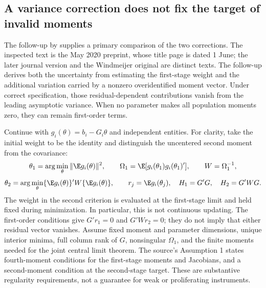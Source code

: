 \subsection{A variance correction does not fix the target of invalid moments}
\label{rel32:gmm-variance-target}
The follow-up by \citet[Sections 2--4]{rel32hkl} supplies a primary
comparison of the two corrections. The inspected text is the May 2020
preprint, whose title page is dated 1 June; the later journal version
and the Windmeijer original are distinct texts. The follow-up derives
both the uncertainty from estimating the first-stage weight and the
additional variation carried by a nonzero overidentified moment vector.
Under correct specification, those residual-dependent contributions
vanish from the leading asymptotic variance. When no parameter makes
all population moments zero, they can remain first-order terms.

Continue with $g_i(\theta)=b_i-G_i\theta$ and independent entities.
For clarity, take the initial weight to be the identity and distinguish
the uncentered second moment from the covariance:
\[
 \theta_1=\arg\min_\theta\|\E g_i(\theta)\|^2,\qquad
 \Omega_1=\E[g_i(\theta_1)g_i(\theta_1)'],\qquad W=\Omega_1^{-1},
\]
\[
 \theta_2=\arg\min_\theta
       \{\E g_i(\theta)\}'W\{\E g_i(\theta)\},\qquad
 r_j=\E g_i(\theta_j),\quad H_1=G'G,\quad H_2=G'WG.
\]
The weight in the second criterion is evaluated at the first-stage
limit and held fixed during minimization. In particular, this is not
continuous updating. The first-order conditions give $G'r_1=0$ and
$G'Wr_2=0$; they do not imply that either residual vector vanishes.
Assume fixed moment and parameter dimensions, unique interior minima,
full column rank of $G$, nonsingular $\Omega_1$, and the finite moments
needed for the joint central limit theorem. The source's Assumption 1
states fourth-moment conditions for the first-stage moments and
Jacobians, and a second-moment condition at the second-stage target.
These are substantive regularity requirements, not a guarantee for
weak or proliferating instruments.

